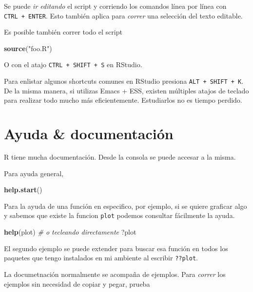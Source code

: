 \documentclass[]{article}
\newenvironment{Shaded}{\begin{snugshade}}{\end{snugshade}}
\newcommand{\KeywordTok}[1]{\textcolor[rgb]{0.13,0.29,0.53}{\textbf{{#1}}}}
\newcommand{\StringTok}[1]{\textcolor[rgb]{0.31,0.60,0.02}{{#1}}}
\newcommand{\CommentTok}[1]{\textcolor[rgb]{0.56,0.35,0.01}{\textit{{#1}}}}
\newcommand{\NormalTok}[1]{{#1}}
\begin{document}
Se puede \emph{ir editando} el script y corriendo los comandos línea por
línea con \texttt{CTRL\ +\ ENTER}. Esto también aplica para
\emph{correr} una selección del texto editable.

Es posible también correr todo el script

\begin{Shaded}
\begin{Highlighting}[]
\KeywordTok{source}\NormalTok{(}\StringTok{"foo.R"}\NormalTok{)}
\end{Highlighting}
\end{Shaded}

O con el atajo \texttt{CTRL\ +\ SHIFT\ +\ S} en RStudio.

Para enlistar algunos shortcuts comunes en RStudio presiona
\texttt{ALT\ +\ SHIFT\ +\ K}. De la misma manera, si utilizas Emacs +
ESS, existen múltiples atajos de teclado para realizar todo mucho más
eficientemente. Estudiarlos no es tiempo perdido.

\section{Ayuda \& documentación}\label{ayuda-documentacion}

R tiene mucha documentación. Desde la consola se puede accesar a la
misma.

Para ayuda general,

\begin{Shaded}
\begin{Highlighting}[]
\KeywordTok{help.start}\NormalTok{()}
\end{Highlighting}
\end{Shaded}

Para la ayuda de una función en especifico, por ejemplo, si se quiere
graficar algo y sabemos que existe la funcion \texttt{plot} podemos
consultar fácilmente la ayuda.

\begin{Shaded}
\begin{Highlighting}[]
\KeywordTok{help}\NormalTok{(plot)}
\CommentTok{# o tecleando directamente}
\NormalTok{?plot}
\end{Highlighting}
\end{Shaded}

El segundo ejemplo se puede extender para buscar esa función en todos
los paquetes que tengo instalados en mi ambiente al escribir
\texttt{??plot}.

La documetnación normalmente se acompaña de ejemplos. Para \emph{correr}
los ejemplos sin necesidad de copiar y pegar, prueba
\end{document}
